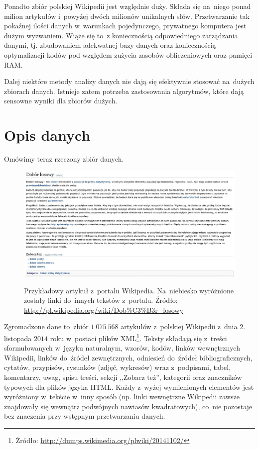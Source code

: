 \documentclass{praca1}
\begin{document}
Ponadto zbiór polskiej Wikipedii jest względnie duży. Składa się na~niego ponad milion artykułów i~powyżej dwóch milionów unikalnych słów. Przetwarzanie tak pokaźnej ilości danych w~warunkach pojedynczego, prywatnego komputera jest dużym wyzwaniem. Wiąże się to~z koniecznością odpowiedniego zarządzania danymi, tj. zbudowaniem adekwatnej bazy danych oraz koniecznością optymalizacji kodów pod względem zużycia zasobów obliczeniowych oraz pamięci RAM.

Dalej niektóre metody analizy danych nie dają się efektywnie stosować na~dużych zbiorach danych. Istnieje zatem potrzeba zastosowania algorytmów, które dają sensowne wyniki dla zbiorów dużych. 


\section{Opis danych}

Omówimy teraz rzeczony zbiór danych.

\begin{figure}[!h]
  \centering
  \includegraphics[width=450pt]{wiki2.jpg}\\
  \caption{Przykładowy artykuł z~portalu Wikipedia. Na~niebiesko wyróżnione zostały linki do~innych tekstów z~portalu. Źródło: \url{http://pl.wikipedia.org/wiki/Dob\%C3\%B3r\_losowy}}\label{wiki}
\end{figure}

Zgromadzone dane to~zbiór $1\ 075\ 568$ artykułów z~polskiej Wikipedii z~dnia $2.$ listopada $2014$ roku w~postaci plików XML\footnote{Żródło: \url{http://dumps.wikimedia.org/plwiki/20141102/}}. Teksty składają się z~treści sformułowanych w~języku naturalnym, wzorów, kodów, linków wewnętrznych Wikipedii, linków do~źródeł zewnętrznych, odniesień do~źródeł bibliograficznych, cytatów, przypisów, rysunków (zdjęć, wykresów) wraz z~podpisami, tabel, komentarzy, uwag, spisu treści, sekcji ,,Zobacz też'', kategorii oraz znaczników typowych dla plików języka HTML. Każdy z~wyżej wymienionych elementów jest wyróżniony w~tekście w~inny sposób (np. linki wewnętrzne Wikipedii zawsze znajdowały się wewnątrz podwójnych nawiasów kwadratowych), co~nie pozostaje bez znaczenia przy wstępnym przetwarzaniu danych.
\end{document}

